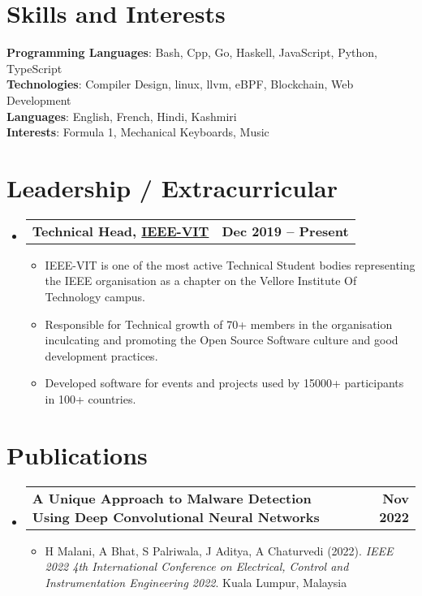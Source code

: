 \documentclass[a4paper,11pt]{article}
\makeatletter
\newcommand{\resumeItem}[1]{
  \item\small{
    {#1 \vspace{-2pt}}
  }
}
\newcommand{\resumeSubheadingg}[2]{
  \vspace{-2pt}\item
    \begin{tabular*}{1.0\textwidth}[t]{l@{\extracolsep{\fill}}r}
      \textbf{#1} & \textbf{\small #2} \\
    \end{tabular*}\vspace{-7pt}
}
\newcommand{\resumeSubHeadingListStart}{\begin{itemize}[leftmargin=0.0in, label={}]}
\newcommand{\resumeSubHeadingListEnd}{\end{itemize}}
\newcommand{\resumeItemListStart}{\begin{itemize}}
\newcommand{\resumeItemListEnd}{\end{itemize}\vspace{-5pt}}
\makeatother
\begin{document}
%
\section{Skills and Interests}
 \begin{itemize}[leftmargin=0.15in, label={}]
    \small{\item{
     \textbf{Programming Languages}{: Bash, Cpp, Go, Haskell, JavaScript, Python, TypeScript} \\
     \textbf{Technologies}{: Compiler Design, linux, llvm, eBPF, Blockchain, Web Development} \\
     \textbf{Languages}{: English, French, Hindi, Kashmiri} \\
     \textbf{Interests}{: Formula 1, Mechanical Keyboards, Music} \\
    }}
 \end{itemize}
 \vspace{-16pt}

\section{Leadership / Extracurricular}
    \resumeSubHeadingListStart
        \resumeSubheadingg{{Technical Head, \href{https://ieeevit.org}{IEEE-VIT}}}{Dec 2019 -- Present}
            \resumeItemListStart
                \resumeItem{IEEE-VIT is one of the most active Technical Student bodies representing the IEEE organisation as a chapter on the Vellore Institute Of Technology campus.}
                \resumeItem{Responsible for Technical growth of 70+ members in the organisation inculcating and promoting the Open Source Software culture and good development practices.}
                \resumeItem{Developed software for events and projects used by 15000+ participants in 100+ countries.}
            \resumeItemListEnd
    \resumeSubHeadingListEnd
    
\section{Publications}
  \resumeSubHeadingListStart
    \resumeSubheadingg
      {A Unique Approach to Malware Detection Using Deep Convolutional Neural Networks}{Nov 2022}
      \resumeItemListStart
        \resumeItem{H Malani, A Bhat, S Palriwala, J Aditya, A Chaturvedi (2022). \textit{IEEE 2022 4th International Conference on Electrical, Control and Instrumentation Engineering 2022}. Kuala Lumpur, Malaysia}
    \resumeItemListEnd
  \resumeSubHeadingListEnd
\end{document}
